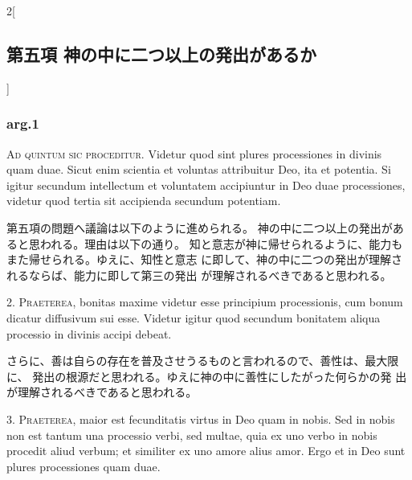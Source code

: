 \documentclass[paper=a4paper,fontsize=10pt,jafontsize=9pt,titlepage]{jlreq}
\begin{document}
\newpage





\begin{paracol}{2}[\subsection{第五項 神の中に二つ以上の発出があるか}]

\subsubsection{arg.1}

{\Huge A}{\scshape d quintum sic proceditur}. Videtur quod sint plures processiones in
 divinis quam duae. Sicut enim scientia et voluntas attribuitur Deo, ita
 et potentia. Si igitur secundum intellectum et voluntatem accipiuntur
 in Deo duae processiones, videtur quod tertia sit accipienda secundum
 potentiam.


\switchcolumn


第五項の問題へ議論は以下のように進められる。
神の中に二つ以上の発出があると思われる。理由は以下の通り。
知と意志が神に帰せられるように、能力もまた帰せられる。ゆえに、知性と意志
 に即して、神の中に二つの発出が理解されるならば、能力に即して第三の発出
 が理解されるべきであると思われる。




2. {\scshape Praeterea}, bonitas maxime videtur esse principium processionis, cum
 bonum dicatur diffusivum sui esse. Videtur igitur quod secundum
 bonitatem aliqua processio in divinis accipi debeat.


\switchcolumn


さらに、善は自らの存在を普及させうるものと言われるので、善性は、最大限に、
 発出の根源だと思われる。ゆえに神の中に善性にしたがった何らかの発
 出が理解されるべきであると思われる。




3. {\scshape Praeterea}, maior est fecunditatis virtus in Deo quam in nobis. Sed in
 nobis non est tantum una processio verbi, sed multae, quia ex uno verbo
 in nobis procedit aliud verbum; et similiter ex uno amore alius
 amor. Ergo et in Deo sunt plures processiones quam duae.



\end{paracol}
\end{document}
